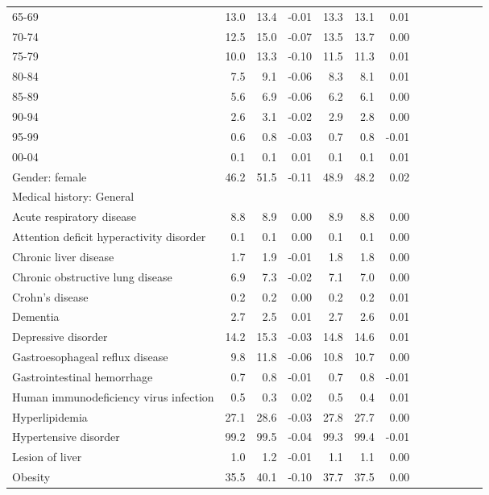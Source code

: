 \documentclass[11pt,]{article}
\begin{document}
\begin{longtable}{lrrrrrrrrrrrr}
      65-69 & 13.0 &  13.4 & -0.01 & 13.3 & 13.1 &  0.01 \\ 
      70-74 & 12.5 &  15.0 & -0.07 & 13.5 & 13.7 &  0.00 \\ 
      75-79 & 10.0 &  13.3 & -0.10 & 11.5 & 11.3 &  0.01 \\ 
      80-84 &  7.5 &   9.1 & -0.06 &  8.3 &  8.1 &  0.01 \\ 
      85-89 &  5.6 &   6.9 & -0.06 &  6.2 &  6.1 &  0.00 \\ 
      90-94 &  2.6 &   3.1 & -0.02 &  2.9 &  2.8 &  0.00 \\ 
      95-99 &  0.6 &   0.8 & -0.03 &  0.7 &  0.8 & -0.01 \\ 
      00-04 &  0.1 &   0.1 &  0.01 &  0.1 &  0.1 &  0.01 \\ 
  Gender: female & 46.2 &  51.5 & -0.11 & 48.9 & 48.2 &  0.02 \\ 
  Medical history: General &    &     &     &    &    &     \\ 
      Acute respiratory disease &  8.8 &   8.9 &  0.00 &  8.9 &  8.8 &  0.00 \\ 
      Attention deficit hyperactivity disorder &  0.1 &   0.1 &  0.00 &  0.1 &  0.1 &  0.00 \\ 
      Chronic liver disease &  1.7 &   1.9 & -0.01 &  1.8 &  1.8 &  0.00 \\ 
      Chronic obstructive lung disease &  6.9 &   7.3 & -0.02 &  7.1 &  7.0 &  0.00 \\ 
      Crohn's disease &  0.2 &   0.2 &  0.00 &  0.2 &  0.2 &  0.01 \\ 
      Dementia &  2.7 &   2.5 &  0.01 &  2.7 &  2.6 &  0.01 \\ 
      Depressive disorder & 14.2 &  15.3 & -0.03 & 14.8 & 14.6 &  0.01 \\ 
      Gastroesophageal reflux disease &  9.8 &  11.8 & -0.06 & 10.8 & 10.7 &  0.00 \\ 
      Gastrointestinal hemorrhage &  0.7 &   0.8 & -0.01 &  0.7 &  0.8 & -0.01 \\ 
      Human immunodeficiency virus infection &  0.5 &   0.3 &  0.02 &  0.5 &  0.4 &  0.01 \\ 
      Hyperlipidemia & 27.1 &  28.6 & -0.03 & 27.8 & 27.7 &  0.00 \\ 
      Hypertensive disorder & 99.2 &  99.5 & -0.04 & 99.3 & 99.4 & -0.01 \\ 
      Lesion of liver &  1.0 &   1.2 & -0.01 &  1.1 &  1.1 &  0.00 \\ 
      Obesity & 35.5 &  40.1 & -0.10 & 37.7 & 37.5 &  0.00 \\ 

\end{longtable}
\end{document}
